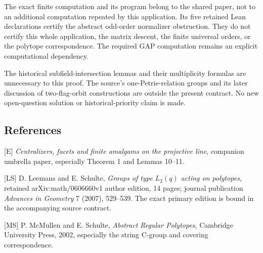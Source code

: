 \documentclass[
  11pt,
  a4paper,
]{article}
\begin{document}
The exact finite computation and its program belong to the shared paper,
not to an additional computation repeated by this application. Its five
retained Lean declarations certify the abstract odd-order normalizer
obstruction. They do not certify this whole application, the matrix
descent, the finite universal orders, or the polytope correspondence.
The required GAP computation remains an explicit computational
dependency.

The historical subfield-intersection lemmas and their multiplicity
formulas are unnecessary to this proof. The source's one-Petrie-relation
groups and its later discussion of two-flag-orbit constructions are
outside the present contract. No new open-question solution or
historical-priority claim is made.

\subsection{References}\label{references}

{[}E{]} \emph{Centralizers, facets and finite amalgams on the projective
line}, companion umbrella paper, especially Theorem 1 and Lemmas 10--11.

{[}LS{]} D. Leemans and E. Schulte, \emph{Groups of type \(L_2(q)\)
acting on polytopes}, retained arXiv:math/0606660v1 author edition, 14
pages; journal publication \emph{Advances in Geometry} 7 (2007),
529--539. The exact primary edition is bound in the accompanying source
contract.

{[}MS{]} P. McMullen and E. Schulte, \emph{Abstract Regular Polytopes},
Cambridge University Press, 2002, especially the string C-group and
covering correspondence.
\end{document}
